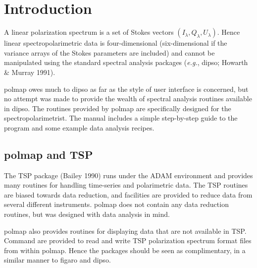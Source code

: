  \begin{latexonly}
   \setlength{\parskip}{0mm}
   \latexonlytoc
   \setlength{\parskip}{\medskipamount}
   \markright{\stardocname}
 \end{latexonly}
\newpage
\renewcommand{\thepage}{\arabic{page}}

\section{Introduction}

A linear polarization spectrum is a set of Stokes vectors
$(I_{\lambda},Q_{\lambda},U_{\lambda})$. Hence linear
spectropolarimetric data is four-dimensional (six-dimensional if the
variance arrays of the Stokes parameters are included) and cannot be
manipulated using the standard spectral analysis packages ({\em e.g.},
{\sc dipso}; Howarth \& Murray 1991).

{\sc polmap} owes much to {\sc dipso} as far as the style of user
interface is concerned, but no attempt was made to provide the wealth
of spectral analysis routines available in {\sc dipso}. The routines
provided by {\sc polmap} are specifically designed for the
spectropolarimetrist. The manual includes a simple step-by-step guide
to the program and some example data analysis recipes.

\subsection{{\sc polmap} and TSP }

The TSP package (Bailey 1990) runs under the ADAM environment and
provides many routines for handling time-series and polarimetric data.
The TSP routines are biased towards data reduction, and facilities are
provided to reduce data from several different instruments. {\sc
polmap} does not contain any data reduction routines, but was designed
with data analysis in mind.

{\sc polmap} also provides routines for displaying data that are not
available in TSP. Command are provided to read and write TSP
polarization spectrum format files from within {\sc polmap}.  Hence the
packages should be seen as complimentary, in a similar manner to {\sc figaro}
and {\sc dipso}.

